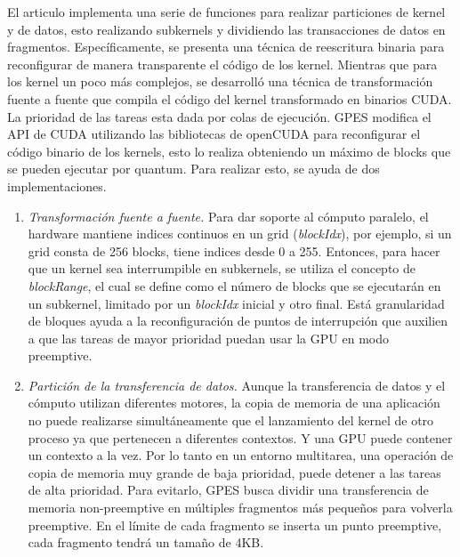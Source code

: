  
 	El articulo \cite{GPES} implementa una serie de funciones para realizar particiones de kernel y de datos, esto realizando subkernels y dividiendo las transacciones de datos en fragmentos. 
Específicamente, se presenta una técnica de reescritura binaria para reconfigurar de manera transparente el código de los kernel. Mientras que para los kernel un poco más complejos, se desarrolló una técnica de transformación fuente a fuente que compila el código del kernel transformado en binarios CUDA. La prioridad de las tareas esta dada por colas de ejecución. GPES modifica el API de CUDA utilizando las bibliotecas de openCUDA para reconfigurar el código binario de los kernels, esto lo realiza obteniendo un máximo de blocks que se pueden ejecutar por quantum. Para realizar esto, se ayuda de dos implementaciones.

\begin{enumerate}
	\item \textit{Transformación fuente a fuente.}
	Para dar soporte al cómputo paralelo, el hardware mantiene indices continuos en un grid (\textit{blockIdx}), por ejemplo, si un grid consta de 256 blocks, tiene indices desde 0 a 255. Entonces, para hacer que un kernel sea interrumpible en subkernels, se utiliza el concepto de \textit{blockRange}, el cual se define como el número de blocks que se ejecutarán en un subkernel, limitado por un \textit{blockIdx} inicial y otro final. Está granularidad de bloques ayuda a la reconfiguración de puntos de interrupción que auxilien a que las tareas de mayor prioridad puedan usar la GPU en modo preemptive.

	\item \textit{Partición de la transferencia de datos.}
	Aunque la transferencia de datos y el cómputo utilizan diferentes motores, la copia de memoria de una aplicación no puede realizarse simultáneamente que el lanzamiento del kernel de otro proceso ya que pertenecen a diferentes contextos. Y una GPU puede contener un contexto a la vez. Por lo tanto en un entorno multitarea, una operación de copia de memoria muy grande de baja prioridad, puede detener a las tareas de alta prioridad. Para evitarlo, GPES busca dividir una transferencia de memoria non-preemptive en múltiples fragmentos más pequeños para volverla preemptive. En el límite de cada fragmento se inserta un punto preemptive, cada fragmento tendrá un tamaño de 4KB.
\end{enumerate}
 

